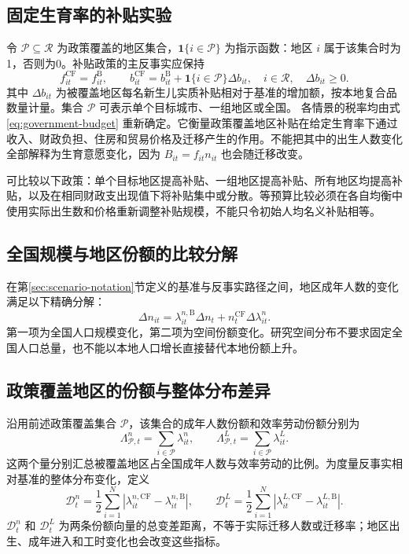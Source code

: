 \documentclass[UTF8,a4paper,zihao=-4,fontset=windows]{ctexart}
\numberwithin{equation}{section}
\newcommand{\B}{\mathrm B}
\newcommand{\CF}{\mathrm{CF}}
\begin{document}
\subsection{固定生育率的补贴实验}
令 $\mathcal P\subseteq\mathcal R$ 为政策覆盖的地区集合，$\mathbf 1\{i\in\mathcal P\}$ 为指示函数：地区 $i$ 属于该集合时为1，否则为0。补贴政策的主反事实应保持
\begin{equation}
  f^{\CF}_{it}=f^\B_{it},\qquad
  b^{\CF}_{it}=b^\B_{it}+\mathbf 1\{i\in\mathcal P\}\Delta b_{it},
  \quad i\in\mathcal R,\quad \Delta b_{it}\geq0.
  \label{eq:fixed-fertility-policy}
\end{equation}
其中 $\Delta b_{it}$ 为被覆盖地区每名新生儿实质补贴相对于基准的增加额，按本地复合品数量计量。集合 $\mathcal P$ 可表示单个目标城市、一组地区或全国。
各情景的税率均由式 \eqref{eq:government-budget} 重新确定。它衡量政策覆盖地区补贴在给定生育率下通过收入、财政负担、住房和贸易价格及迁移产生的作用。不能把其中的出生人数变化全部解释为生育意愿变化，因为 $B_{it}=f_{it}n_{it}$ 也会随迁移改变。

可比较以下政策：单个目标地区提高补贴、一组地区提高补贴、所有地区均提高补贴，以及在相同财政支出现值下将补贴集中或分散。等预算比较必须在各自均衡中使用实际出生数和价格重新调整补贴规模，不能只令初始人均名义补贴相等。

\subsection{全国规模与地区份额的比较分解}
在第\ref{sec:scenario-notation}节定义的基准与反事实路径之间，地区成年人数的变化满足以下精确分解：
\begin{equation}
  \Delta n_{it}=\lambda^{n,\B}_{it}\Delta n_t
               +n_t^{\CF}\Delta\lambda^n_{it}.
  \label{eq:scale-share-decomposition}
\end{equation}
第一项为全国人口规模变化，第二项为空间份额变化。研究空间分布不要求固定全国人口总量，也不能以本地人口增长直接替代本地份额上升。

\subsection{政策覆盖地区的份额与整体分布差异}
沿用前述政策覆盖集合 $\mathcal P$，该集合的成年人数份额和效率劳动份额分别为
\begin{equation}
  \Lambda^n_{\mathcal P,t}=\sum_{i\in\mathcal P}\lambda^n_{it},
  \qquad
  \Lambda^L_{\mathcal P,t}=\sum_{i\in\mathcal P}\lambda^L_{it}.
  \label{eq:target-region-shares}
\end{equation}
这两个量分别汇总被覆盖地区占全国成年人数与效率劳动的比例。为度量反事实相对基准的整体分布变化，定义
\begin{equation}
  \mathcal D^n_t=\frac12\sum_{i=1}^N
       |\lambda^{n,\CF}_{it}-\lambda^{n,\B}_{it}|,\qquad
  \mathcal D^L_t=\frac12\sum_{i=1}^N
       |\lambda^{L,\CF}_{it}-\lambda^{L,\B}_{it}|.
  \label{eq:distribution-distance}
\end{equation}
$\mathcal D^n_t$ 和 $\mathcal D^L_t$ 为两条份额向量的总变差距离，不等于实际迁移人数或迁移率；地区出生、成年进入和工时变化也会改变这些指标。
\end{document}
